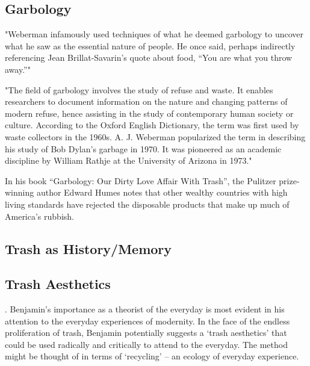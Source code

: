 \subsection{Garbology}
"Weberman infamously used techniques of what he deemed garbology to uncover what he saw as the essential nature of people. He once said, perhaps indirectly referencing Jean Brillat-Savarin’s quote about food, “You are what you throw away.”" \cite{lukas2012garbage}

"The field of garbology involves the study of refuse and waste. It enables researchers to document information on the nature and changing patterns of modern refuse, hence assisting in the study of contemporary human society or culture. According to the Oxford English Dictionary, the term was first used by waste collectors in the 1960s. A. J. Weberman popularized the term in describing his study of Bob Dylan’s garbage in 1970. It was pioneered as an academic discipline by William Rathje at the University of Arizona in 1973."

In his book “Garbology: Our Dirty Love Affair With Trash”, the Pulitzer prize-winning author Edward Humes notes that other wealthy countries with high living standards have rejected the disposable products that make up much of America's rubbish.

\subsection{Trash as History/Memory}
\cite{bullock2012trash}

\subsection{Trash Aesthetics}
  \cite{highmore2002thrashaesthetics}. Benjamin’s importance as a theorist of the everyday is most evident in his attention to the everyday experiences of modernity. In the face of the endless proliferation of trash, Benjamin potentially suggests a ‘trash aesthetics’ that could be used radically and critically to attend to the everyday. The method might be thought of in terms of ‘recycling’ – an ecology of everyday experience.



